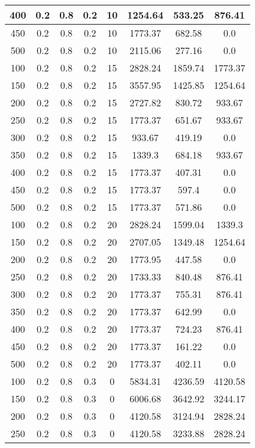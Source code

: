 \documentclass[a4paper, 12pt]{extreport}
\begin{document}
\begin{itemize}
\begin{longtable}{|c|c|c|c|c|c|c|c|}
			400 & 0.2 & 0.8 & 0.2 & 10 & 1254.64 & 533.25 & 876.41 \\\hline
			450 & 0.2 & 0.8 & 0.2 & 10 & 1773.37 & 682.58 & 0.0 \\\hline
			500 & 0.2 & 0.8 & 0.2 & 10 & 2115.06 & 277.16 & 0.0 \\\hline
			100 & 0.2 & 0.8 & 0.2 & 15 & 2828.24 & 1859.74 & 1773.37 \\\hline
			150 & 0.2 & 0.8 & 0.2 & 15 & 3557.95 & 1425.85 & 1254.64 \\\hline
			200 & 0.2 & 0.8 & 0.2 & 15 & 2727.82 & 830.72 & 933.67 \\\hline
			250 & 0.2 & 0.8 & 0.2 & 15 & 1773.37 & 651.67 & 933.67 \\\hline
			300 & 0.2 & 0.8 & 0.2 & 15 & 933.67 & 419.19 & 0.0 \\\hline
			350 & 0.2 & 0.8 & 0.2 & 15 & 1339.3 & 684.18 & 933.67 \\\hline
			400 & 0.2 & 0.8 & 0.2 & 15 & 1773.37 & 407.31 & 0.0 \\\hline
			450 & 0.2 & 0.8 & 0.2 & 15 & 1773.37 & 597.4 & 0.0 \\\hline
			500 & 0.2 & 0.8 & 0.2 & 15 & 1773.37 & 571.86 & 0.0 \\\hline
			100 & 0.2 & 0.8 & 0.2 & 20 & 2828.24 & 1599.04 & 1339.3 \\\hline
			150 & 0.2 & 0.8 & 0.2 & 20 & 2707.05 & 1349.48 & 1254.64 \\\hline
			200 & 0.2 & 0.8 & 0.2 & 20 & 1773.95 & 447.58 & 0.0 \\\hline
			250 & 0.2 & 0.8 & 0.2 & 20 & 1733.33 & 840.48 & 876.41 \\\hline
			300 & 0.2 & 0.8 & 0.2 & 20 & 1773.37 & 755.31 & 876.41 \\\hline
			350 & 0.2 & 0.8 & 0.2 & 20 & 1773.37 & 642.99 & 0.0 \\\hline
			400 & 0.2 & 0.8 & 0.2 & 20 & 1773.37 & 724.23 & 876.41 \\\hline
			450 & 0.2 & 0.8 & 0.2 & 20 & 1773.37 & 161.22 & 0.0 \\\hline
			500 & 0.2 & 0.8 & 0.2 & 20 & 1773.37 & 402.11 & 0.0 \\\hline
			100 & 0.2 & 0.8 & 0.3 & 0 & 5834.31 & 4236.59 & 4120.58 \\\hline
			150 & 0.2 & 0.8 & 0.3 & 0 & 6006.68 & 3642.92 & 3244.17 \\\hline
			200 & 0.2 & 0.8 & 0.3 & 0 & 4120.58 & 3124.94 & 2828.24 \\\hline
			250 & 0.2 & 0.8 & 0.3 & 0 & 4120.58 & 3233.88 & 2828.24 \\\hline

\end{longtable}
\end{itemize}
\end{document}
